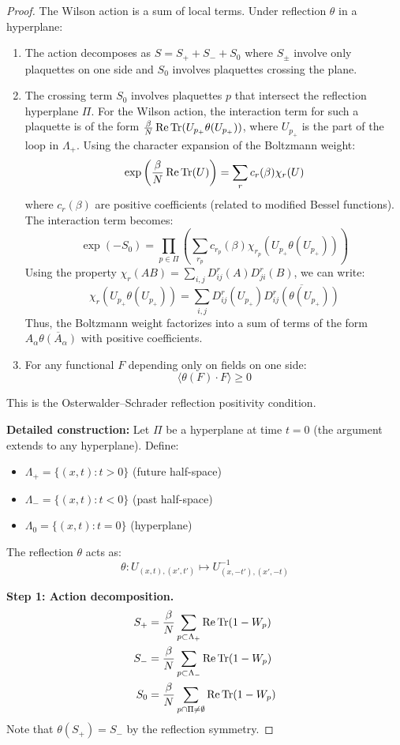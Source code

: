 \begin{proof}
The Wilson action is a sum of local terms. Under reflection $\theta$ in a 
hyperplane:
\begin{enumerate}[label=(\alph*)]
\item The action decomposes as $S = S_+ + S_- + S_0$ where $S_\pm$ involve 
only plaquettes on one side and $S_0$ involves plaquettes crossing the plane.
\item The crossing term $S_0$ involves plaquettes $p$ that intersect the reflection hyperplane $\Pi$. For the Wilson action, the interaction term for such a plaquette is of the form $\frac{\beta}{N} \operatorname{Re}\operatorname{Tr}(U_{p_+} \theta(U_{p_+}))$, where $U_{p_+}$ is the part of the loop in $\Lambda_+$.
Using the character expansion of the Boltzmann weight:
\[
\exp\left(\frac{\beta}{N} \operatorname{Re}\operatorname{Tr}(U)\right) = \sum_r c_r(\beta) \chi_r(U)
\]
where $c_r(\beta)$ are positive coefficients (related to modified Bessel functions).
The interaction term becomes:
\[
\exp(-S_0) = \prod_{p \in \Pi} \left( \sum_{r_p} c_{r_p}(\beta) \chi_{r_p}(U_{p_+} \theta(U_{p_+})) \right)
\]
Using the property $\chi_r(AB) = \sum_{i,j} D_{ij}^r(A) D_{ji}^r(B)$, we can write:
\[
\chi_r(U_{p_+} \theta(U_{p_+})) = \sum_{i,j} D_{ij}^r(U_{p_+}) \overline{D_{ij}^r(\theta(U_{p_+}))}
\]
Thus, the Boltzmann weight factorizes into a sum of terms of the form $A_\alpha \overline{\theta(A_\alpha)}$ with positive coefficients.
\item For any functional $F$ depending only on fields on one side:
\[
\langle \theta(F) \cdot F \rangle \geq 0
\]
\end{enumerate}
This is the Osterwalder--Schrader reflection positivity condition.

\textbf{Detailed construction:} Let $\Pi$ be a hyperplane at time $t = 0$ 
(the argument extends to any hyperplane). Define:
\begin{itemize}
\item $\Lambda_+ = \{(x,t) : t > 0\}$ (future half-space)
\item $\Lambda_- = \{(x,t) : t < 0\}$ (past half-space)
\item $\Lambda_0 = \{(x,t) : t = 0\}$ (hyperplane)
\end{itemize}

The reflection $\theta$ acts as:
\[
\theta : U_{(x,t),(x',t')} \mapsto U_{(x,-t'),(x',-t)}^{-1}
\]

\textbf{Step 1: Action decomposition.}
\begin{align*}
S_+ &= \frac{\beta}{N} \sum_{p \subset \Lambda_+} \operatorname{Re}\operatorname{Tr}(1 - W_p) \\
S_- &= \frac{\beta}{N} \sum_{p \subset \Lambda_-} \operatorname{Re}\operatorname{Tr}(1 - W_p) \\
S_0 &= \frac{\beta}{N} \sum_{p \cap \Pi \neq \emptyset} \operatorname{Re}\operatorname{Tr}(1 - W_p)
\end{align*}
Note that $\theta(S_+) = S_-$ by the reflection symmetry.


\end{proof}

